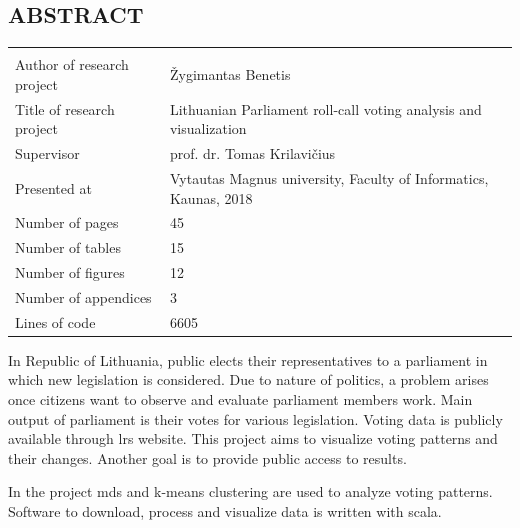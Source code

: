 \documentclass[a4paper,12pt]{article}
\begin{document}
	
	
	
	\begin{center}
		\section*{ABSTRACT}
	\end{center}
	
	
	
	\noindent
	\begin{center}
		\begin{tabular}{L{4.5cm} L{8cm}}
			\\ 
			Author of research project & Žygimantas Benetis \\
			Title of research project & Lithuanian Parliament roll-call voting analysis and visualization\\
			Supervisor & prof. dr. Tomas Krilavičius\\
			Presented at & Vytautas Magnus university, Faculty of Informatics, Kaunas, 2018\\
			Number of pages & 45\\
			Number of tables & 15\\
			Number of figures & 12\\
			Number of appendices & 3\\
			Lines of code & 6605\\
		\end{tabular}
	\end{center} 
	
	\vspace{5mm}
	
	In Republic of Lithuania, public elects their representatives to a parliament in which new legislation is considered. Due to nature of politics, a problem arises once citizens want to observe and evaluate parliament members work. Main output of parliament is their votes for various legislation. Voting data is publicly available through \gls{lrs} website. This project aims to visualize voting patterns and their changes. Another goal is to provide public access to results.
	
	In the project \gls{mds} and \gls{k-means} clustering are used to analyze voting patterns. Software to download, process and visualize  data is written with \gls{scala}.
	
	
	\clearpage
	
\end{document}
